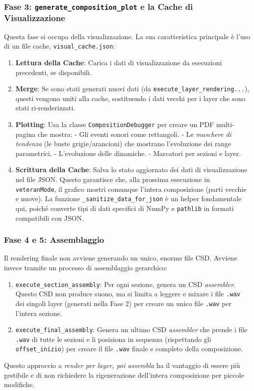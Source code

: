 \subsubsection{Fase 3: \texttt{generate\_composition\_plot} e la Cache di Visualizzazione}
Questa fase si occupa della visualizzazione. La sua caratteristica principale è l'uso di un file cache, \texttt{visual\_cache.json}:
\begin{enumerate}
    \item \textbf{Lettura della Cache}: Carica i dati di visualizzazione da esecuzioni precedenti, se disponibili.
    \item \textbf{Merge}: Se sono stati generati nuovi dati (da \texttt{execute\_layer\_rendering...}), questi vengono uniti alla cache, sostituendo i dati vecchi per i layer che sono stati ri-renderizzati.
    \item \textbf{Plotting}: Usa la classe \texttt{CompositionDebugger} per creare un PDF multi-pagina che mostra: -  Gli eventi sonori come rettangoli. -  Le \textit{maschere di tendenza} (le buste grigie/arancioni) che mostrano l'evoluzione dei range parametrici. -  L'evoluzione delle dinamiche. -  Marcatori per sezioni e layer.
    \item \textbf{Scrittura della Cache}: Salva lo stato aggiornato dei dati di visualizzazione nel file JSON. Questo garantisce che, alla prossima esecuzione in \texttt{veteranMode}, il grafico mostri comunque l'intera composizione (parti vecchie e nuove). La funzione \texttt{\_sanitize\_data\_for\_json} è un helper fondamentale qui, poiché converte tipi di dati specifici di NumPy e \texttt{pathlib} in formati compatibili con JSON.
\end{enumerate}
\subsubsection{Fase 4 e 5: Assemblaggio}
Il rendering finale non avviene generando un unico, enorme file CSD. Avviene invece tramite un processo di assemblaggio gerarchico:

\begin{enumerate}
    \item \texttt{execute\_section\_assembly}: Per ogni sezione, genera un CSD \textit{assembler}. Questo CSD non produce suono, ma si limita a leggere e mixare i file \texttt{.wav} dei singoli layer (generati nella Fase 2) per creare un unico file \texttt{.wav} per l'intera sezione.
    \item \texttt{execute\_final\_assembly}: Genera un ultimo CSD \textit{assembler} che prende i file \texttt{.wav} di tutte le sezioni e li posiziona in sequenza (rispettando gli \texttt{offset\_inizio}) per creare il file \texttt{.wav} finale e completo della composizione.
\end{enumerate}
Questo approccio a \textit{render per layer, poi assembla} ha il vantaggio di essere più gestibile e di non richiedere la rigenerazione dell'intera composizione per piccole modifiche.

